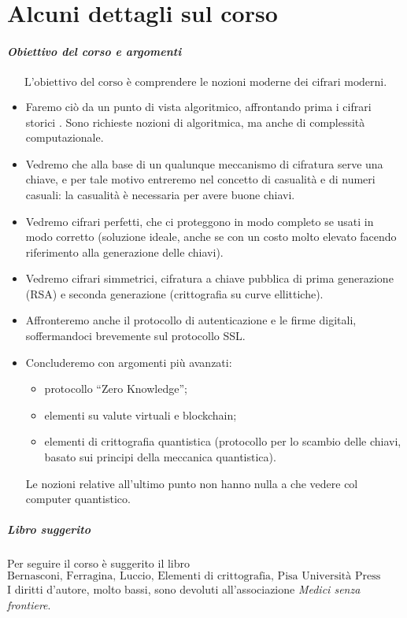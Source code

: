 \chapter{Alcuni dettagli sul corso}
\paragraph{Obiettivo del corso e argomenti}
\[\boxed{\text{L’obiettivo del corso è comprendere le nozioni moderne dei cifrari moderni.}}\]
\begin{itemize}
	\item Faremo ciò da un punto di vista algoritmico, affrontando prima i cifrari storici . Sono richieste nozioni di algoritmica, ma anche di complessità computazionale. 
	\item Vedremo che alla base di un qualunque meccanismo di cifratura serve una chiave, e per tale motivo entreremo nel concetto di casualità e di numeri casuali: la casualità è necessaria per avere buone chiavi.
	
	\item Vedremo cifrari perfetti, che ci proteggono in modo completo se usati in modo corretto (soluzione ideale, anche se con un costo molto elevato facendo riferimento alla generazione delle chiavi).
	
	\item Vedremo cifrari simmetrici, cifratura a chiave pubblica di prima generazione (RSA) e seconda generazione (crittografia su curve ellittiche).
	
	\item Affronteremo anche il protocollo di autenticazione e le firme digitali, soffermandoci brevemente sul protocollo SSL.
	
	\item Concluderemo con argomenti più avanzati:
	\begin{itemize}
		\item protocollo “Zero Knowledge”;
		\item	elementi su valute virtuali e blockchain;
		\item	elementi di crittografia quantistica (protocollo per lo scambio delle chiavi, basato sui principi della meccanica quantistica).
	\end{itemize}
	Le nozioni relative all’ultimo punto non hanno nulla a che vedere col computer quantistico.
\end{itemize}
\paragraph{Libro suggerito}
Per seguire il corso è suggerito il libro 
\[\boxed{\text{Bernasconi, Ferragina, Luccio, Elementi di crittografia, Pisa Università Press 2015}}\]
I diritti d’autore, molto bassi, sono devoluti all’associazione \textit{Medici senza frontiere}.

